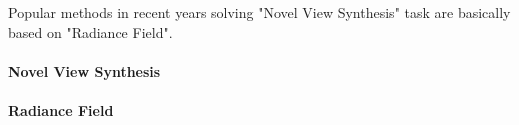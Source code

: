 Popular methods in recent years solving "Novel View Synthesis" task are basically 
based on "Radiance Field".

\paragraph{Novel View Synthesis}


\paragraph{Radiance Field}
